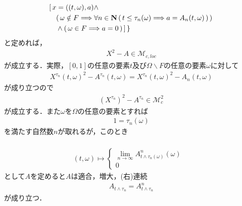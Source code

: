 \begin{sketch}
\begin{description}
\begin{align}
					&[\, x = ((t,\omega),a) \wedge \\
					&\quad (\, \omega \notin F \Longrightarrow \forall n \in \mathbf{N}\, 
					(\, t \leq \tau_{n}(\omega) \Longrightarrow a = A_{n}(t,\omega)\, )\, )\, \\
					&\quad \wedge (\, \omega \in F \Longrightarrow a = 0\, )\, ]\, \}
				\end{align}
				と定めれば，
				\begin{align}
					X^{2} - A \in \mathscr{M}_{c,loc}
				\end{align}
				が成立する．実際，$[0,1]$の任意の要素$t$及び$\Omega \backslash F$の任意の要素$\omega$に対して
				\begin{align}
					{X^{\tau_{n}}(t,\omega)}^{2} - A^{\tau_{n}}(t,\omega)
					= {X^{\tau_{n}}(t,\omega)}^{2} - A_{n}(t,\omega)
				\end{align}
				が成り立つので
				\begin{align}
					\left(X^{\tau_{n}}\right)^{2} - A^{\tau_{n}} \in \mathscr{M}_{c}^{2}
				\end{align}
				が成立する．また$\omega$を$\Omega$の任意の要素とすれば
				\begin{align}
					1 = \tau_{n}(\omega)
				\end{align}
				を満たす自然数$n$が取れるが，このとき
				\begin{align}
					
				\end{align}
				
				
				\begin{align}
					(t,\omega) \longmapsto
					\begin{cases}
						\lim_{n \to \infty} A^n_{t \wedge \tau_n(\omega)}(\omega) & \\
						0
					\end{cases}
				\end{align}
				として$A$を定めると$A$は適合，増大，(右)連続
				\begin{align}
					A_{t \wedge \tau_n} = A^n_{t \wedge \tau_n}
				\end{align}
				が成り立つ．
				

\end{description}
\end{sketch}
